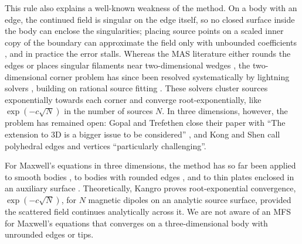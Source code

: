 This rule also explains a well-known weakness of the method. On a body with an edge, the continued field is singular on the edge itself, so no closed surface inside the body can enclose the singularities; placing source points on a scaled inner copy of the boundary can approximate the field only with unbounded coefficients \cite{doicu2000,kangro2012}, and in practice the error stalls. Whereas the MAS literature either rounds the edges \cite{bogdanov1999} or places singular filaments near two-dimensional wedges \cite{eisler1989,shifman1997}, the two-dimensional corner problem has since been resolved systematically by lightning solvers \cite{gopal2019siam,gopal2019pnas,ginn2023}, building on rational source fitting \cite{hochman2013}. These solvers cluster sources exponentially towards each corner and converge root-exponentially, like $\exp(-c\sqrt{N})$ in the number of sources $N$. In three dimensions, however, the problem has remained open: Gopal and Trefethen close their paper with ``The extension to 3D is a bigger issue to be considered'' \cite{gopal2019siam}, and Kong and Shen \cite{kong2026} call polyhedral edges and vertices ``particularly challenging''.

For Maxwell's equations in three dimensions, the method has so far been applied to smooth bodies \cite{young2005}, to bodies with rounded edges \cite{ye2023}, and to thin plates enclosed in an auxiliary surface \cite{tabatadze2025}. Theoretically, Kangro \cite{kangro2012} proves root-exponential convergence, $\exp(-c\sqrt{N})$, for $N$ magnetic dipoles on an analytic source surface, provided the scattered field continues analytically across it. We are not aware of an MFS for Maxwell's equations that converges on a three-dimensional body with unrounded edges or tips.

